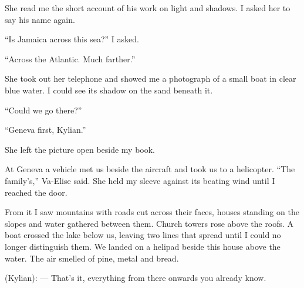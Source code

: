 She read me the short account of his work on light and shadows. I asked her to say his name again.\par

``Is Jamaica across this sea?'' I asked.\par

``Across the Atlantic. Much farther.''\par

She took out her telephone and showed me a photograph of a small boat in clear blue water. I could see its shadow on the sand beneath it.\par

``Could we go there?''\par

``Geneva first, Kylian.''\par

She left the picture open beside my book.\par

At Geneva a vehicle met us beside the aircraft and took us to a helicopter. ``The family's,'' Va-Elise said. She held my sleeve against its beating wind until I reached the door.\par

From it I saw mountains with roads cut across their faces, houses standing on the slopes and water gathered between them. Church towers rose above the roofs. A boat crossed the lake below us, leaving two lines that spread until I could no longer distinguish them. We landed on a helipad beside this house above the water. The air smelled of pine, metal and bread.\par

\begin{room}

(Kylian): --- That's it, everything from there onwards you already know. 

\end{room}
